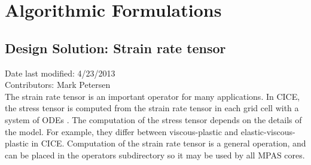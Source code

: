 \documentclass[11pt]{report}
\begin{document}

\chapter{Algorithmic Formulations}

\section{Design Solution: Strain rate tensor}
Date last modified: 4/23/2013 \\
Contributors: Mark Petersen \\

The strain rate tensor is an important operator for many applications.  In CICE, the stress tensor is computed from the strain rate tensor in each grid cell with a system of ODEs \cite[section 3.4]{CICE_manual_4.1}.  The computation of the stress tensor depends on the details of the model.  For example, they differ between viscous-plastic and elastic-viscous-plastic in CICE.  Computation of the strain rate tensor is a general operation, and can be placed in the operators subdirectory so it may be used by all MPAS cores.
\end{document}
